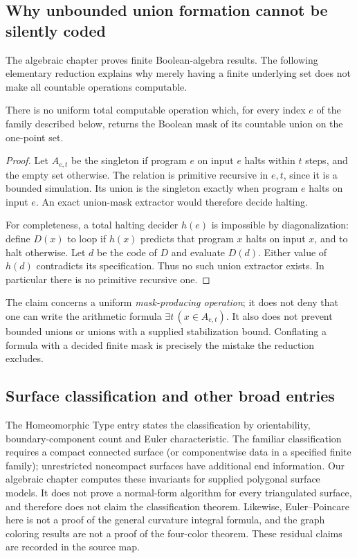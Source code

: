 \subsection{Why unbounded union formation cannot be silently coded}

The algebraic chapter proves finite Boolean-algebra results. The following elementary reduction explains why merely having a finite underlying set does not make all countable operations computable.

\begin{proposition}
There is no uniform total computable operation which, for every index $e$ of the family described below, returns the Boolean mask of its countable union on the one-point set.
\end{proposition}
\begin{proof}
Let $A_{e,t}$ be the singleton if program $e$ on input $e$ halts within $t$ steps, and the empty set otherwise. The relation is primitive recursive in $e,t$, since it is a bounded simulation. Its union is the singleton exactly when program $e$ halts on input $e$. An exact union-mask extractor would therefore decide halting.

For completeness, a total halting decider $h(e)$ is impossible by diagonalization: define $D(x)$ to loop if $h(x)$ predicts that program $x$ halts on input $x$, and to halt otherwise. Let $d$ be the code of $D$ and evaluate $D(d)$. Either value of $h(d)$ contradicts its specification. Thus no such union extractor exists. In particular there is no primitive recursive one.
\end{proof}

The claim concerns a uniform \emph{mask-producing operation}; it does not deny that one can write the arithmetic formula $\exists t\,(x\in A_{e,t})$. It also does not prevent bounded unions or unions with a supplied stabilization bound. Conflating a formula with a decided finite mask is precisely the mistake the reduction excludes.

\subsection{Surface classification and other broad entries}

The Homeomorphic Type entry states the classification by orientability, boundary-component count and Euler characteristic. The familiar classification requires a compact connected surface (or componentwise data in a specified finite family); unrestricted noncompact surfaces have additional end information. Our algebraic chapter computes these invariants for supplied polygonal surface models. It does not prove a normal-form algorithm for every triangulated surface, and therefore does not claim the classification theorem. Likewise, Euler--Poincare here is not a proof of the general curvature integral formula, and the graph coloring results are not a proof of the four-color theorem. These residual claims are recorded in the source map.

